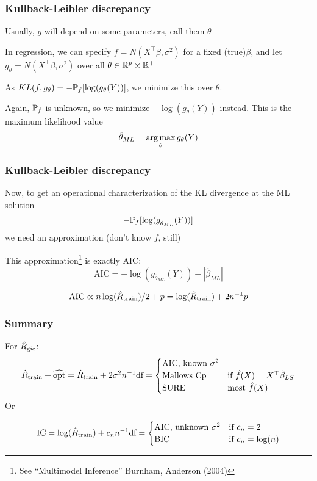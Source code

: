 \documentclass{beamer}
\begin{document}
\begin{frame}
\frametitle{ Kullback-Leibler discrepancy  }
Usually, $g$ will depend on some parameters, call them $\theta$
\vvsp

In regression, we can specify $f = N(X^{\top} \beta, \sigma^2)$ for a fixed 
(true)\footnotemark  $\beta$, and let $g_\theta = N(X^{\top}\beta,\sigma^2)$ over all $\theta \in \R^p\times\R^+$

\vvsp
As $KL(f,g_\theta) = -\P_f [\log (g_\theta(Y))]$, we minimize this over $\theta$.

\vsp
Again, $\P_f$ is unknown, so we minimize $-\log (g_\theta(Y))$ instead.  This is the maximum likelihood value
\[
\hat{\theta}_{ML} = \argmax_\theta g_\theta(Y)
\]

\end{frame}

\begin{frame}
\frametitle{ Kullback-Leibler discrepancy  }
Now, to get an operational characterization of the KL divergence at the ML solution
\[
-\P_f [\log (g_{\hat\theta_{ML}}(Y))]
\]
we need an approximation (don't know $f$, still)

\vsp
This approximation\footnote{See ``Multimodel Inference'' Burnham, Anderson (2004)} is exactly AIC:
\[
\textrm{AIC} = -\log (g_{\hat\theta_{ML}}(Y)) + |\hat\beta_{ML}|
\]

\[
\textrm{AIC} \propto n \log(\train)/2 + p  = \log(\train) + 2n^{-1}p
\]


\end{frame}

\begin{frame}
\frametitle{ Summary }

For $\gichat$:
\[
\train + \opthat = \train + 2\sigma^2n^{-1}\df =
\begin{cases}
\textrm{AIC, known } \sigma^2 \\
\textrm{Mallows Cp } & \textrm{if } \hat{f}(X) = X^{\top}\hat\beta_{LS} \\ 
\textrm{SURE } & \textrm{most } \hat{f}(X)
\end{cases}
\]
Or

\[
\textrm{IC} = \log (\train) + c_n n^{-1}\df =
\begin{cases}
\textrm{AIC, unknown } \sigma^2 & \textrm{if } c_n = 2\\
\textrm{BIC}& \textrm{if } c_n = \log(n)
\end{cases}
\]
\end{frame}
\end{document}
